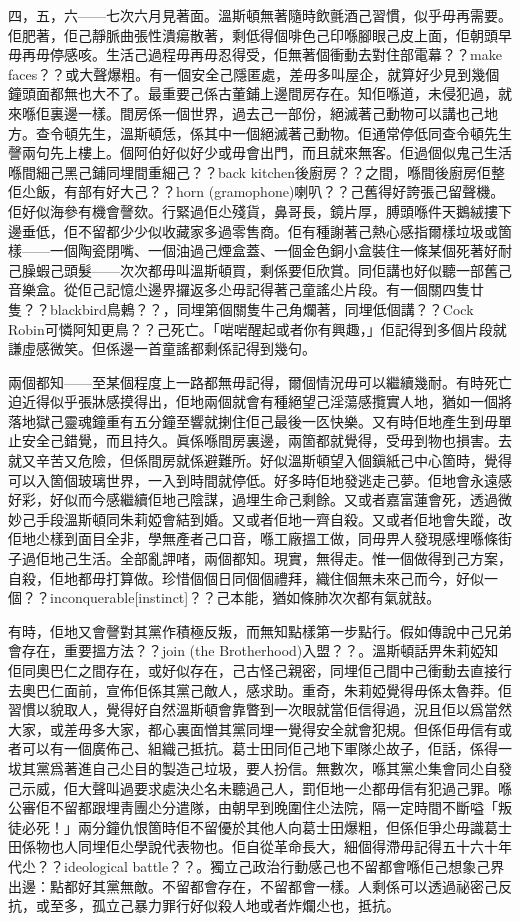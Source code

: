 四，五，六——七次六月見著面。溫斯頓無著隨時飲氈酒己習慣，似乎毋再需要。佢肥著，佢己靜脈曲張性潰瘍散著，剩低得個啡色己印喺腳眼己皮上面，佢朝頭早毋再毋停感咳。生活己過程毋再毋忍得受，佢無著個衝動去對住部電幕？？make faces？？或大聲爆粗。有一個安全己隱匿處，差毋多叫屋企，就算好少見到幾個鐘頭面都無也大不了。最重要己係古董鋪上邊間房存在。知佢喺道，未侵犯過，就來喺佢裏邊一樣。間房係一個世界，過去己一部份，絕滅著己動物可以講也己地方。查令頓先生，溫斯頓恁，係其中一個絕滅著己動物。佢通常停低同查令頓先生謦兩句先上樓上。個阿伯好似好少或毋會出門，而且就來無客。佢過個似鬼己生活喺間細己黑己鋪同埋間重細己？？back kitchen後廚房？？之間，喺間後廚房佢整佢尐飯，有部有好大己？？horn (gramophone)喇叭？？己舊得好誇張己留聲機。佢好似海參有機會謦欬。行緊過佢尐殘貨，鼻哥長，鏡片厚，膊頭喺件天鵝絨摟下邊垂低，佢不留都少少似收藏家多過零售商。佢有種謝著己熱心感指爾樣垃圾或箇樣——一個陶瓷閉嘴、一個油過己煙盒蓋、一個金色銅小盒裝住一條某個死著好耐己臊蝦己頭髮——次次都毋叫溫斯頓買，剩係要佢欣賞。同佢講也好似聽一部舊己音樂盒。從佢己記憶尐邊界攞返多尐毋記得著己童謠尐片段。有一個關四隻廿隻？？blackbird鳥鶇？？，同埋第個關隻牛己角爛著，同埋低個講？？Cock Robin可憐阿知更鳥？？己死亡。「啱啱醒起或者你有興趣，」佢記得到多個片段就謙虛感微笑。但係邊一首童謠都剩係記得到幾句。

兩個都知——至某個程度上一路都無毋記得，爾個情況毋可以繼續幾耐。有時死亡迫近得似乎張牀感摸得出，佢地兩個就會有種絕望己淫蕩感攬實人地，猶如一個將落地獄己靈魂鐘重有五分鐘至響就揦住佢己最後一匛快樂。又有時佢地產生到毋單止安全己錯覺，而且持久。眞係喺間房裏邊，兩箇都就覺得，受毋到物也損害。去就又辛苦又危險，但係間房就係避難所。好似溫斯頓望入個鎭紙己中心箇時，覺得可以入箇個玻璃世界，一入到時間就停低。好多時佢地發逃走己夢。佢地會永遠感好彩，好似而今感繼續佢地己陰謀，過埋生命己剩餘。又或者嘉富蓮會死，透過微妙己手段溫斯頓同朱莉婭會結到婚。又或者佢地一齊自殺。又或者佢地會失蹤，改佢地尐樣到面目全非，學無產者己口音，喺工廠搵工做，同毋畀人發現感埋喺條街子過佢地己生活。全部亂䛅啫，兩個都知。現實，無得走。惟一個做得到己方案，自殺，佢地都毋打算做。珍惜個個日同個個禮拜，織住個無未來己而今，好似一個？？inconquerable[instinct]？？己本能，猶如條肺次次都有氣就㪗。

有時，佢地又會謦對其黨作積極反叛，而無知點樣第一步點行。假如傳說中己兄弟會存在，重要搵方法？？join (the Brotherhood)入盟？？。溫斯頓話畀朱莉婭知佢同奧巴仁之間存在，或好似存在，己古怪己親密，同埋佢己間中己衝動去直接行去奧巴仁面前，宣佈佢係其黨己敵人，感求助。重奇，朱莉婭覺得毋係太魯莽。佢習慣以貌取人，覺得好自然溫斯頓會靠瞥到一次眼就當佢信得過，況且佢以爲當然大家，或差毋多大家，都心裏面憎其黨同埋一覺得安全就會犯規。但係佢毋信有或者可以有一個廣佈己、組織己抵抗。葛士田同佢己地下軍隊尐故子，佢話，係得一坺其黨爲著進自己尐目的製造己垃圾，要人扮信。無數次，喺其黨尐集會同尐自發己示威，佢大聲叫過要求處決尐名未聽過己人，罰佢地一尐都毋信有犯過己罪。喺公審佢不留都跟埋靑團尐分遣隊，由朝早到晚圍住尐法院，隔一定時間不斷嗌「叛徒必死！」兩分鐘仇恨箇時佢不留優於其他人向葛士田爆粗，但係佢爭尐毋識葛士田係物也人同埋佢尐學說代表物也。佢自從革命長大，細個得滯毋記得五十六十年代尐？？ideological battle？？。獨立己政治行動感己也不留都會喺佢己想𧰼己界出邊：點都好其黨無敵。不留都會存在，不留都會一樣。人剩係可以透過祕密己反抗，或至多，孤立己暴力罪行好似殺人地或者炸爛尐也，抵抗。

